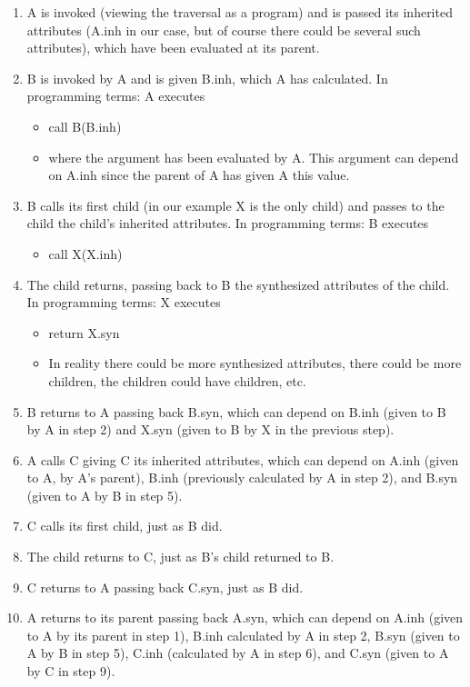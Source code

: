 \documentclass[a4paper,12pt]{article}
\begin{document}
\begin{enumerate}
\item A is invoked (viewing the traversal as a program) and is passed its inherited attributes (A.inh in our case, but of course there could be several such attributes), which have been evaluated at its parent.
\item B is invoked by A and is given B.inh, which A has calculated. In programming terms: A executes
\begin{itemize}
\item[ ] call B(B.inh)
\item[ ]  where the argument has been evaluated by A. This argument can depend on A.inh since the parent of A has given A this value.
\end{itemize}
\item B calls its first child (in our example X is the only child) and passes to the child the child's inherited attributes. In programming terms: B executes
\begin{itemize}
\item[ ] call X(X.inh)
\end{itemize}
\item The child returns, passing back to B the synthesized attributes of the child. In programming terms: X executes
\begin{itemize}
\item[ ] return X.syn
\item[ ] In reality there could be more synthesized attributes, there could be more children, the children could have children, etc.
\end{itemize}
\item B returns to A passing back B.syn, which can depend on B.inh (given to B by A in step 2) and X.syn (given to B by X in the previous step).
\item A calls C giving C its inherited attributes, which can depend on A.inh (given to A, by A's parent), B.inh (previously calculated by A in step 2), and B.syn (given to A by B in step 5).
\item C calls its first child, just as B did.
\item The child returns to C, just as B's child returned to B.
\item C returns to A passing back C.syn, just as B did.
\item A returns to its parent passing back A.syn, which can depend on A.inh (given to A by its parent in step 1), B.inh calculated by A in step 2, B.syn (given to A by B in step 5), C.inh (calculated by A in step 6), and C.syn (given to A by C in step 9).
\end{enumerate}
\end{document}
